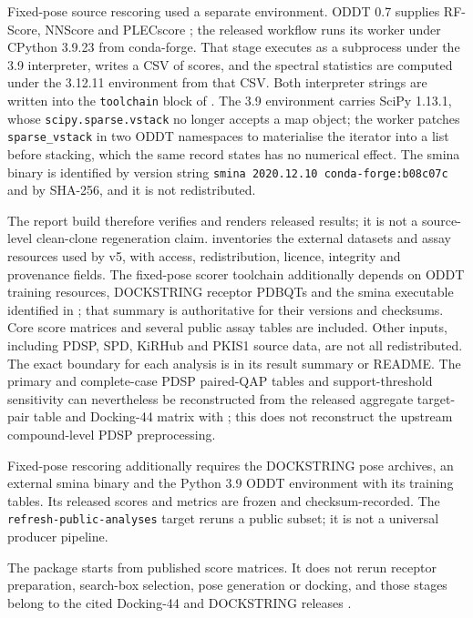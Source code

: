 Fixed-pose source rescoring used a separate environment. ODDT 0.7 supplies RF-Score, NNScore and
PLECscore \cite{oddt2015}; the released workflow runs its worker under CPython 3.9.23 from
conda-forge. That stage executes
 as a subprocess under the 3.9 interpreter, writes a
CSV of scores, and the spectral statistics are computed under the 3.12.11 environment from that
CSV. Both interpreter strings are written into the \texttt{toolchain} block of
. The 3.9 environment carries SciPy 1.13.1,
whose \texttt{scipy.sparse.vstack} no longer accepts a map object; the worker patches
\texttt{sparse\_vstack} in two ODDT namespaces to materialise the iterator into a list before
stacking, which the same record states has no numerical effect. The smina binary
\cite{smina2013} is identified by version string \texttt{smina 2020.12.10 conda-forge:b08c07c}
and by SHA-256, and it is not redistributed.

The report build therefore verifies and renders released results; it is not a source-level
clean-clone regeneration claim.  inventories the external datasets and
assay resources used by v5, with access, redistribution, licence, integrity and provenance fields.
The fixed-pose scorer toolchain additionally depends on ODDT training resources, DOCKSTRING
receptor PDBQTs and the smina executable identified in
; that summary is authoritative for their
versions and checksums. Core score matrices and several public assay tables are included. Other
inputs, including PDSP, SPD, KiRHub and PKIS1 source data, are not all redistributed. The
exact boundary for each analysis is in its result summary or README. The primary and complete-case PDSP paired-QAP tables and
support-threshold sensitivity can nevertheless be reconstructed from the released aggregate
target-pair table and Docking-44 matrix with
; this does not reconstruct the upstream
compound-level PDSP preprocessing.

Fixed-pose rescoring additionally requires the DOCKSTRING pose archives, an external smina binary
and the Python 3.9 ODDT environment with its training tables. Its released scores and metrics are
frozen and checksum-recorded. The \texttt{refresh-public-analyses} target reruns a public subset;
it is not a universal producer pipeline.

The package starts from published score matrices. It does not rerun receptor preparation, search-box
selection, pose generation or docking, and those stages belong to the cited Docking-44 and
DOCKSTRING releases \cite{nikitin2025,dockstring2022}.

